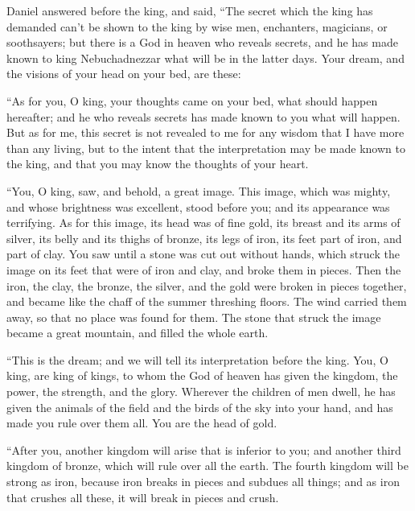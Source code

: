{\par }{\PP {}Daniel answered before the king, and said, “The secret which the king has demanded can’t be shown to the king by wise men, enchanters, magicians, or soothsayers;
but there is a God in heaven who reveals secrets, and he has made known to king Nebuchadnezzar what will be in the latter days. Your dream, and the visions of your head on your bed, are these:
\par }{\PP {}“As for you, O king, your thoughts came on your bed, what should happen hereafter; and he who reveals secrets has made known to you what will happen.
But as for me, this secret is not revealed to me for any wisdom that I have more than any living, but to the intent that the interpretation may be made known to the king, and that you may know the thoughts of your heart.
\par }{\PP {}“You, O king, saw, and behold, a great image. This image, which was mighty, and whose brightness was excellent, stood before you; and its appearance was terrifying.
As for this image, its head was of fine gold, its breast and its arms of silver, its belly and its thighs of bronze,
its legs of iron, its feet part of iron, and part of clay.
You saw until a stone was cut out without hands, which struck the image on its feet that were of iron and clay, and broke them in pieces.
Then the iron, the clay, the bronze, the silver, and the gold were broken in pieces together, and became like the chaff of the summer threshing floors. The wind carried them away, so that no place was found for them. The stone that struck the image became a great mountain, and filled the whole earth.
\par }{\PP {}“This is the dream; and we will tell its interpretation before the king.
You, O king, are king of kings, to whom the God of heaven has given the kingdom, the power, the strength, and the glory.
Wherever the children of men dwell, he has given the animals of the field and the birds of the sky into your hand, and has made you rule over them all. You are the head of gold.
\par }{\PP {}“After you, another kingdom will arise that is inferior to you; and another third kingdom of bronze, which will rule over all the earth.
The fourth kingdom will be strong as iron, because iron breaks in pieces and subdues all things; and as iron that crushes all these, it will break in pieces and crush.
}
